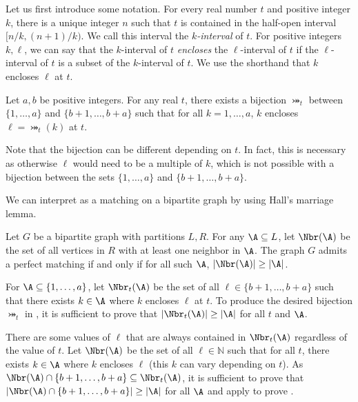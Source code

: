 \documentclass{toc}
\begin{document}
Let us first introduce some notation. For every real number $t$ and positive integer $k$, there is a unique integer $n$ such that $t$ is contained in the half-open interval $[n/k, (n+1)/k)$. We call this interval the \emph{$k$-interval} of $t$. For positive integers $k,\ell$, we can say that the $k$-interval of $t$ \emph{encloses} the $\ell$-interval of $t$ if the $\ell$-interval of $t$ is a subset of the $k$-interval of $t$. We use the shorthand that $k$ encloses $\ell$ at $t$.

\begin{lemma}
    \label{lemma:intervalmatching}
    Let $a,b$ be positive integers. For any real $t$, there exists a bijection $\bij_t$ between $\{1,\dots,a\}$ and $\{b+1,\dots,b+a\}$ such that for all $k=1,\dots,a$, $k$ encloses $\ell=\bij_t(k)$ at $t$.
\end{lemma}
Note that the bijection can be different depending on $t$. In fact, this is necessary as otherwise $\ell$ would need to be a multiple of $k$, which is not possible with a bijection between the sets $\{1,\dots,a\}$ and $\{b+1,\dots,b+a\}$.

We can interpret  as a matching on a bipartite graph by using Hall's marriage lemma.

\begin{lemma}
    \label{thm:hall}
    Let $G$ be a bipartite graph with partitions $L,R$. For any $\A\subseteq L$, let $\Nbr(\A)$ be the set of all vertices in $R$ with at least one neighbor in $\A$. The graph $G$ admits a perfect matching if and only if for all such $\A$, $|\Nbr(\A)|\ge |\A|$. 
\end{lemma}

For $\A\subseteq \{1,\dots,a\}$, let $\Nbr_t(\A)$ be the set of all $\ell\in\{b+1,\dots,b+a\}$ such that there exists $k\in \A$ where $k$ encloses $\ell$ at $t$. To produce the desired bijection $\bij_t$ in , it is sufficient to prove that $|\Nbr_t(\A)|\ge |\A|$ for all $t$ and $\A$.

There are some values of $\ell$ that are always contained in $\Nbr_t(\A)$ regardless of the value of $t$. Let $\Nbr(\A)$ be the set of all $\ell\in\mathbb{N}$ such that for all $t$, there exists $k\in \A$ where $k$ encloses $\ell$ (this $k$ can vary depending on $t$). As $\Nbr(\A)\cap \{b+1,\dots,b+a\}\subseteq \Nbr_t(\A)$, it is sufficient to prove that $|\Nbr(\A)\cap \{b+1,\dots,b+a\}|\ge |\A|$ for all $\A$ and apply  to prove .
\end{document}
